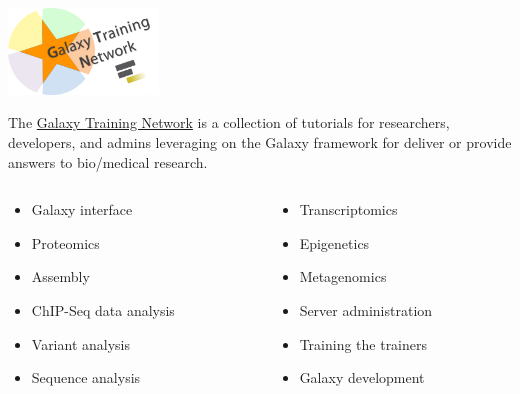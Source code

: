 \documentclass[xcolor=dvipsnames]{beamer}
\begin{document}
%
%
\begin{frame}
  \frametitle{\three}
  \begin{center}
    \includegraphics[width=0.30\textwidth]{images/logo_gtn}
  \end{center}
  The \href{https://galaxyproject.github.io/training-material/}{Galaxy Training Network} is a collection of tutorials for researchers, developers, and admins leveraging on the Galaxy framework for deliver or provide answers to bio/medical research.\newline
  \begin{columns}
    \begin{column}{0.5\textwidth}
      \scriptsize{
        \begin{itemize}
          \item Galaxy interface
          \item Proteomics
          \item Assembly
          \item ChIP-Seq data analysis
          \item Variant analysis
          \item Sequence analysis
        \end{itemize}
      }
    \end{column}
    \begin{column}{0.5\textwidth}
      \scriptsize{
        \begin{itemize}
          \item Transcriptomics
          \item Epigenetics
          \item Metagenomics
          \item Server administration
          \item Training the trainers
          \item Galaxy development
        \end{itemize}
      }
    \end{column}
  \end{columns}
\end{frame}
\end{document}
